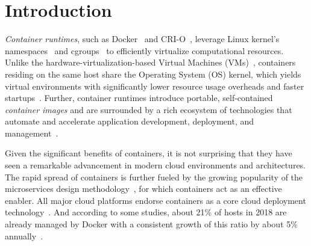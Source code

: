 \section{Introduction}
\label{sec:intro}

%
%
%
%
%
%
%




\emph{Container runtimes}, such as Docker~\cite{docker} and
\mbox{CRI-O}~\cite{cri-o}, leverage Linux kernel's namespaces~\cite{namespaces}
and cgroups~\cite{cgroups}
to efficiently virtualize computational resources.
%
Unlike the hardware-virtualization-based Virtual Machines
(VMs)~\cite{adams2006comparison}, containers residing on the same host share the
Operating System (OS) kernel, which yields virtual environments with
significantly lower resource usage overheads and faster startups~\cite{7819678}.
%
Further, container runtimes introduce portable, self-contained
\emph{container images} and are surrounded by a rich ecosystem of technologies
that automate and accelerate application development, deployment, and
management~\cite{cncfprojects}.

Given the significant benefits of containers, it is not surprising that they
have seen a remarkable advancement in modern cloud environments and
architectures.
%
The rapid spread of containers is further fueled by the growing popularity of
the microservices design methodology~\cite{wolff2016microservices}, for which
containers act as an effective enabler.
%
All major cloud platforms endorse containers as a core cloud deployment
technology~\cite{googlecengine,azurec,ibmkube,awscont}.
%
And according to some studies, about 21\% of hosts in 2018 are already managed
by Docker with a consistent growth of this ratio by about 5\%
annually~\cite{20percentdocker}.


